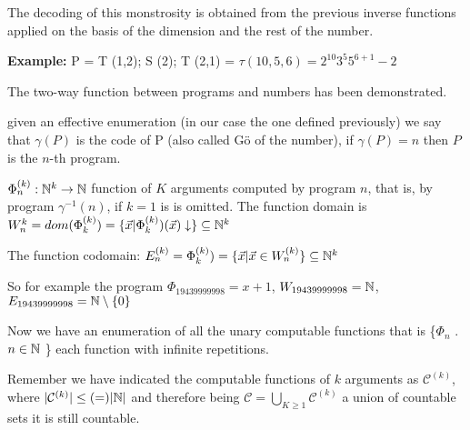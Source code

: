 The decoding of this monstrosity is obtained from the previous inverse
functions applied on the basis of the dimension and the rest of the
number.

\textbf{Example:} P = T (1,2); S (2); T (2,1) = $ \tau(10,5,6) = 2^{10} 3^5 5^{6+1} -2 $

The two-way function between programs and numbers has been demonstrated.

\begin{notation} given an effective enumeration (in our case the one defined previously) we say that $ \gamma(P) $ is the code of P (also called G\"{o} of the number), if $ \gamma(P) = n $ then $P$ is the $n$-th program.
\end{notation}

\begin{notation} $ \Phi_n^{(k)}: \mathbb{N}^k\rightarrow\mathbb{N} $ function of $K$ arguments computed by program $n$, that is, by program $ \gamma^{-1}(n) $, if $k = 1$ is is omitted. The function domain  is $ W_n^{k} = dom(\Phi_k^{(k)}) = \{\vec{x} | \Phi_k^{(k)})(\vec{x})\downarrow  \} \subseteq \mathbb{N}^k$

  The function codomain: $ E^{(k)}_n = \Phi_k^{(k)}) = \{\vec{x} | \vec{x} \in W_n^{(k)} \} \subseteq \mathbb{N}^k$
\end{notation}

So for example the program $ \Phi_{19439999998} = x+1 $, $ W_{19439999998} = \mathbb{N} $, $ E_{19439999998} = \mathbb{N} \setminus \{0\} $

Now we have an enumeration of all the unary computable functions that is \{$ \Phi_n $ . $ n \in \mathbb{N} $ \} each function with infinite repetitions.

Remember we have indicated the computable functions of $k$ arguments as $ \mathcal{C} ^ {(k)} $, where $ | \mathcal{C} ^ {(k)} | \leq (=) | \mathbb{N} | $ and therefore being $ \mathcal{C} = \bigcup_{K \geq 1} \mathcal{C} ^ {(k)} $ a union of countable sets it is still countable.
